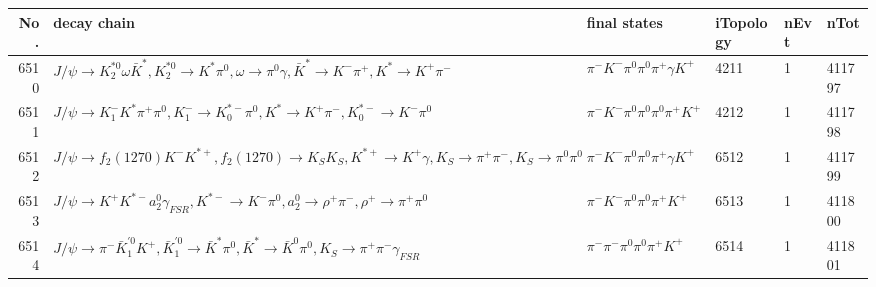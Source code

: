 \begin{table}[htbp] 
\begin{center}
\begin{small}
\begin{tabular}{rlllll}\hline\hline
 No. & decay chain & final states &  iTopology & nEvt & nTot \\\hline
6510&$J/\psi       \rightarrow K_2^{*0}       \omega         \bar{K}^{*}   , K_2^{*0}        \rightarrow K^{*}          \pi^{0}        , \omega          \rightarrow \pi^{0}        \gamma       , \bar{K}^{*}    \rightarrow K^{-}          \pi^{+}        , K^{*}           \rightarrow K^{+}          \pi^{-}        $&$\pi^{-}        K^{-}          \pi^{0}        \pi^{0}        \pi^{+}        \gamma       K^{+}          $& 4211&    1&411797\\
6511&$J/\psi       \rightarrow K_{1}^{-}      K^{*}          \pi^{+}        \pi^{0}        , K_{1}^{-}       \rightarrow K_{0}^{*-}     \pi^{0}        , K^{*}           \rightarrow K^{+}          \pi^{-}        , K_{0}^{*-}      \rightarrow K^{-}          \pi^{0}        $&$\pi^{-}        K^{-}          \pi^{0}        \pi^{0}        \pi^{0}        \pi^{+}        K^{+}          $& 4212&    1&411798\\
6512&$J/\psi       \rightarrow f_{2}(1270)    K^{-}          K^{*+}         , f_{2}(1270)     \rightarrow K_{S}          K_{S}          , K^{*+}          \rightarrow K^{+}          \gamma       , K_{S}           \rightarrow \pi^{+}        \pi^{-}        , K_{S}           \rightarrow \pi^{0}        \pi^{0}        $&$\pi^{-}        K^{-}          \pi^{0}        \pi^{0}        \pi^{+}        \gamma       K^{+}          $& 6512&    1&411799\\
6513&$J/\psi       \rightarrow K^{+}          K^{*-}         a_{2}^{0}      \gamma_{FSR} , K^{*-}          \rightarrow K^{-}          \pi^{0}        , a_{2}^{0}       \rightarrow \rho^{+}      \pi^{-}        , \rho^{+}       \rightarrow \pi^{+}        \pi^{0}        $&$\pi^{-}        K^{-}          \pi^{0}        \pi^{0}        \pi^{+}        K^{+}          $& 6513&    1&411800\\
6514&$J/\psi       \rightarrow \pi^{-}        \bar{K}_1^{'0}K^{+}          , \bar{K}_1^{'0} \rightarrow \bar{K}^{*}   \pi^{0}        , \bar{K}^{*}    \rightarrow \bar{K}^{0}   \pi^{0}        , K_{S}           \rightarrow \pi^{+}        \pi^{-}        \gamma_{FSR} $&$\pi^{-}        \pi^{-}        \pi^{0}        \pi^{0}        \pi^{+}        K^{+}          $& 6514&    1&411801\\

\end{tabular}
\end{small}
\end{center}
\end{table}
